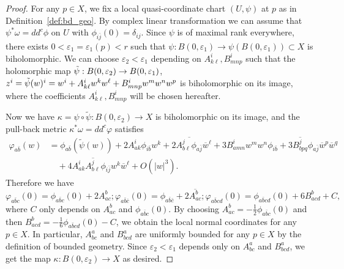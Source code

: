 \documentclass[10pt,a4paper]{amsart}
\begin{document}
\begin{proof} 
For any $p\in X$, we fix a local quasi-coordinate chart $(U,\psi)$ at $p$  as in Definition~\ref{def:bd_geo}.  By complex linear transformation we can assume that $\psi^*\omega =dd^c \phi$ on $U$ with $\phi_{i \bar j}(0)=\delta_{ij}$.  Since $\psi$ is of maximal rank everywhere, there exists $0<\varepsilon_1=\varepsilon_1(p)<r$ such that $\psi: B(0, \varepsilon_1)\rightarrow 
\psi(B(0, \varepsilon_1))\subset X$ is biholomorphic.  We can choose $\varepsilon_2<\varepsilon_1$ depending on $A^i_{k\ell}, B^i_{mnp} $  such that the holomorphic map  $\Tilde{\psi}: B(0,\varepsilon_2) \rightarrow B(0,\varepsilon_1) $,  $z^i= \Tilde\psi(w)^i= w^i+ A^i_{k\ell}w^kw^\ell + B^i_{mnp} w^m w^n w^p$   is biholomorphic on its image, where  the coefficients $A^i_{k\ell},B^i_{mnp} $  will be chosen hereafter. 

\medskip
Now we have  $\kappa=\psi\circ \tilde\psi:B(0,\varepsilon_2)\rightarrow X$ is biholomorphic on its image,  and the pull-back metric $ \kappa^*\omega =dd^c \varphi$  satisfies
\begin{align*}
   \varphi_{a\bar b} (w)&=\phi_{a\bar b}(\tilde \psi(w)) + 2A^i_{a k}\phi_{i\bar b}w^{k}  + 2\overline{A^j_{b\ell}\phi_{a\bar j}}\overline{w}^\ell + 3B^i_{amn}w^m w^n  \phi_{i\bar b} + 3 \overline{B^j_{bpq}}\phi_{a\bar j}\overline{w}^p\overline{w}^q \\
   &\quad + 4 A^{i}_{a k}\overline{A^j_{b\ell}}\phi_{i\bar j}w^k\overline{w}^\ell+O(|w|^3). 
\end{align*}
Therefore we have
$$
\varphi_{a\bar b c}(0) = \phi_{a\bar b c}(0)+ 2 A^{b}_{ac};  \varphi_{a\bar b \bar c}(0) = \phi_{a\bar b \bar c}+ 2 \overline{ A^{b}_{ac}}; \varphi_{a\bar b cd}(0) = \phi_{a\bar b c d}(0) +6 B^{b}_{acd}+C,
$$
where $C$ only depends on $A^{b}_{ac}$ and $\phi_{a\bar b c}(0)$.
By choosing $A^b_{ac}=-\frac{1}{2}\phi_{a\bar b c}(0)$ and then $B^b_{acd}=-\frac{1}{6}\phi_{a\bar b c d}(0) - C$,  we obtain the local normal coordinates for any $p\in X$. In particular, $A^{a}_{bc}$ and $B^a_{bcd}$ are uniformly bounded for any $p\in X$ by the  definition of bounded geometry. Since $\varepsilon_2<\varepsilon_1$ depends only on $A^{a}_{bc}$ and $B^a_{bcd}$,  we get the map $\kappa: B(0,\varepsilon_2)\rightarrow X$ as desired.
\end{proof}
\end{document}
